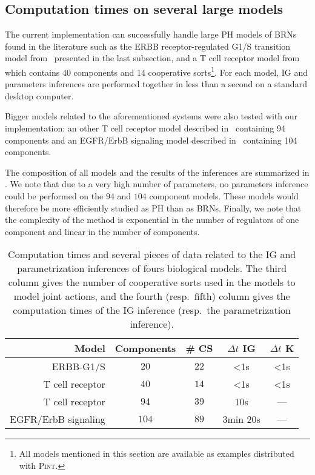 \subsection{Computation times on several large models}\label{ssec:cpu}

The current implementation can successfully handle large PH models of BRNs found in the literature
such as the ERBB receptor-regulated G1/S transition model from~\cite{Sahin09} presented in the last subsection,
and a T cell receptor model from~\cite{Klamt06} which contains 40 components and 14 cooperative
sorts\footnote{All models mentioned in this section are available as examples distributed with \textsc{Pint}.}.
For each model, IG and parameters inferences are performed together in less than a second
on a standard desktop computer.

Bigger models related to the aforementioned systems were also tested with our implementation:
an other T cell receptor model described in~\cite{SaezRodriguez2007} containing 94 components
and an EGFR/ErbB signaling model described in~\cite{Samaga2009} containing 104 components.

The composition of all models and the results of the inferences are summarized in .
We note that due to a very high number of parameters, no parameters inference could be performed on the $94$ and $104$ component models.
These models would therefore be more efficiently studied as PH than as BRNs.
Finally, we note that the complexity of the method is exponential in the number of regulators of one
component and linear in the number of components.

\begin{table}
\begin{center}
  \begin{tabular}{r|c|c|c|c}
    \textbf{Model} & \textbf{Components} & \textbf{\# CS} & \textbf{$\Delta t$ IG} & \textbf{$\Delta t$ K}
\\\hline\hline
    ERBB-G1/S \cite{Sahin09} & $20$ & $22$ & <1s & <1s
\\\hline
    T cell receptor \cite{Klamt06} & $40$ & $14$ & <1s & <1s
\\\hline
    T cell receptor \cite{SaezRodriguez2007} & $94$ & $39$ & 10s & ---
\\\hline
    EGFR/ErbB signaling \cite{Samaga2009} & $104$ & $89$ & 3min 20s & ---
  \end{tabular}
\end{center}
\caption{
  Computation times and several pieces of data related to the IG and parametrization inferences of fours biological models.
  The third column gives the number of cooperative sorts used in the models to model joint actions,
  and the fourth (resp.~fifth) column gives the computation times of the IG inference (resp.~the parametrization inference).
  }
\label{tb:computation}
\end{table}
